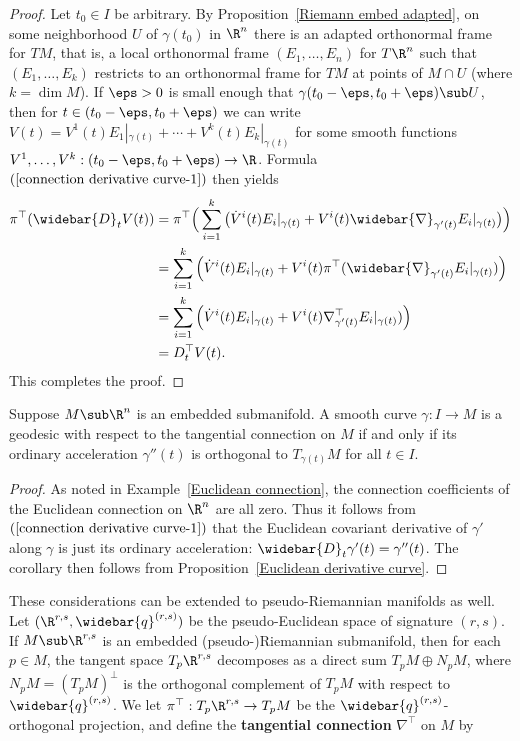 \begin{proof}
Let $t_0\in I$ be arbitrary. By Proposition~\ref{Riemann embed adapted}, on some neighborhood $U$ of $\gamma(t_0)$ in $\R^n$ there is an adapted orthonormal frame for $TM$, 
that is, a local orthonormal frame $(E_1,\dots,E_n)$ for $T\R^n$ such that $(E_1,\dots,E_k)$ restricts to an orthonormal frame for $TM$ at points of $M\cap U$ (where $k=\dim M$). If $\eps>0$ is small enough that $\gamma(t_0-\eps,t_0+\eps)\sub U$, then for $t\in(t_0-\eps,t_0+\eps)$ we can write $V(t)=V^1(t)E_1|_{\gamma(t)}+\cdots+V^k(t)E_k|_{\gamma(t)}$ for some smooth functions $V^1,\dots,V^k:(t_0-\eps,t_0+\eps)\to\R$. Formula $(\ref{connection derivative curve-1})$ then yields
\begin{align*}
\pi^{\top}(\widebar{D}_tV(t))&=\pi^{\top}\Big(\sum_{i=1}^{k}\big(\dot{V}^i(t)E_i|_{\gamma(t)}+V^i(t)\widebar{\nabla}_{\gamma'(t)}E_i|_{\gamma(t)}\big)\Big)\\
&=\sum_{i=1}^{k}\Big(\dot{V}^i(t)E_i|_{\gamma(t)}+V^i(t)\pi^{\top}(\widebar{\nabla}_{\gamma'(t)}E_i|_{\gamma(t)})\Big)\\
&=\sum_{i=1}^{k}\Big(\dot{V}^i(t)E_i|_{\gamma(t)}+V^i(t)\nabla^{\top}_{\gamma'(t)}E_i|_{\gamma(t)})\Big)\\
&=D_t^{\top}V(t).
\end{align*}
This completes the proof.
\end{proof}
\begin{corollary}\label{Euclidean geodesic submani}
Suppose $M\sub\R^n$ is an embedded submanifold. A smooth curve $\gamma:I\to M$ is a geodesic with respect to the tangential connection on $M$ if and only if its ordinary acceleration $\gamma''(t)$ is orthogonal to $T_{\gamma(t)}M$ for all $t\in I$.
\end{corollary}
\begin{proof}
As noted in Example~\ref{Euclidean connection}, the connection coefficients of the Euclidean connection on $\R^n$ are all zero. Thus it follows from $(\ref{connection derivative curve-1})$ that the Euclidean covariant derivative of $\gamma'$ along $\gamma$ is just its ordinary acceleration: $\widebar{D}_t\gamma'(t)=\gamma''(t)$. The corollary then 
follows from Proposition~\ref{Euclidean derivative curve}.
\end{proof}
These considerations can be extended to pseudo-Riemannian manifolds as well. Let $(\R^{r,s},\widebar{q}^{(r,s)})$ be the pseudo-Euclidean space of signature $(r,s)$. If $M\sub\R^{r,s}$ is an embedded (pseudo-)Riemannian submanifold, then for each $p\in M$, the tangent space $T_p\R^{r,s}$ decomposes as a direct sum $T_pM\oplus N_pM$, where $N_pM=(T_pM)^{\bot}$ is the orthogonal complement of $T_pM$ with respect to $\widebar{q}^{(r,s)}$. We let $\pi^{\top}:T_p\R^{r,s}\to T_pM$ be the $\widebar{q}^{(r,s)}$-orthogonal projection, and define the \textbf{tangential connection} $\nabla^{\top}$ on $M$ by

